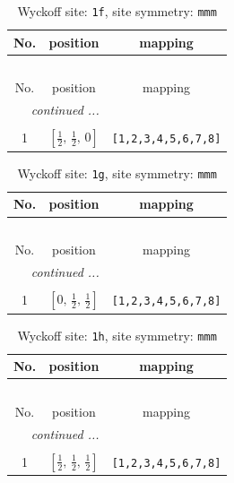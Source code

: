 \documentclass[fleqn,8pt]{jsarticle}
\begin{document}
\renewcommand{\arraystretch}{1.2}
\begin{longtable}{ccc}
\caption{Wyckoff site: {\tt 1f}, site symmetry: {\tt mmm}}
 \\
 \hline \hline
No. & position & mapping \\ \hline \endfirsthead

\multicolumn{2}{l}{\tablename\ \thetable{}} \\
 \hline \hline
No. & position & mapping \\ \hline \endhead

 \hline \hline
\multicolumn{2}{r}{\footnotesize\it continued ...} \\ \endfoot

 \hline \hline
\multicolumn{2}{r}{} \\ \endlastfoot

1 & $\left[ \frac{1}{2},\, \frac{1}{2},\, 0 \right]$ & {\tt [1,2,3,4,5,6,7,8]} \\
\end{longtable}
\renewcommand{\arraystretch}{1.2}
\begin{longtable}{ccc}
\caption{Wyckoff site: {\tt 1g}, site symmetry: {\tt mmm}}
 \\
 \hline \hline
No. & position & mapping \\ \hline \endfirsthead

\multicolumn{2}{l}{\tablename\ \thetable{}} \\
 \hline \hline
No. & position & mapping \\ \hline \endhead

 \hline \hline
\multicolumn{2}{r}{\footnotesize\it continued ...} \\ \endfoot

 \hline \hline
\multicolumn{2}{r}{} \\ \endlastfoot

1 & $\left[ 0,\, \frac{1}{2},\, \frac{1}{2} \right]$ & {\tt [1,2,3,4,5,6,7,8]} \\
\end{longtable}
\renewcommand{\arraystretch}{1.2}
\begin{longtable}{ccc}
\caption{Wyckoff site: {\tt 1h}, site symmetry: {\tt mmm}}
 \\
 \hline \hline
No. & position & mapping \\ \hline \endfirsthead

\multicolumn{2}{l}{\tablename\ \thetable{}} \\
 \hline \hline
No. & position & mapping \\ \hline \endhead

 \hline \hline
\multicolumn{2}{r}{\footnotesize\it continued ...} \\ \endfoot

 \hline \hline
\multicolumn{2}{r}{} \\ \endlastfoot

1 & $\left[ \frac{1}{2},\, \frac{1}{2},\, \frac{1}{2} \right]$ & {\tt [1,2,3,4,5,6,7,8]} \\
\end{longtable}
\end{document}
